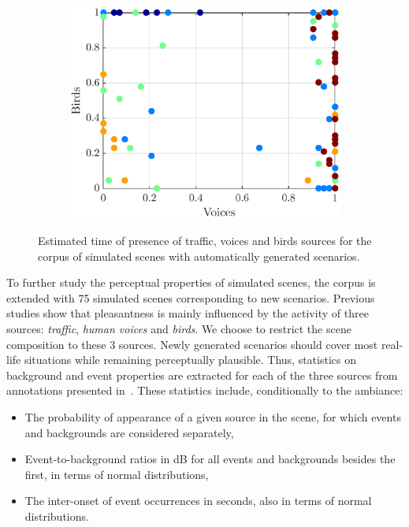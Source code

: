 \documentclass[11pt,a4paper]{article}
\begin{document}
\begin{figure}[h]
\begin{subfigure}[t]{0.33\textwidth}
        \includegraphics[width=\textwidth]{figures/vb_pres.eps}
    \end{subfigure}
    \caption{Estimated time of presence of traffic, voices and birds sources for the corpus of simulated scenes with automatically generated scenarios.}\label{fig:tvb_pres}
\end{figure}

To further study the perceptual properties of simulated scenes, the corpus is extended with 75 simulated scenes corresponding to new scenarios. Previous studies show that pleasantness is mainly influenced by the activity of three sources: \textit{traffic}, \textit{human voices} and \textit{birds}. We choose to restrict the scene composition to these 3 sources. Newly generated scenarios should cover most real-life situations while remaining perceptually plausible. Thus, statistics on background and event properties are extracted for each of the three sources from annotations presented in~\cite{gloaguen2017}. These statistics include, conditionally to the ambiance:

\begin{itemize}
\item The probability of appearance of a given source in the scene, for which events and backgrounds are considered separately,
\item Event-to-background ratios in dB for all events and backgrounds besides the first, in terms of normal distributions,
\item The inter-onset of event occurrences in seconds, also in terms of normal distributions.
\end{itemize}
\end{document}
